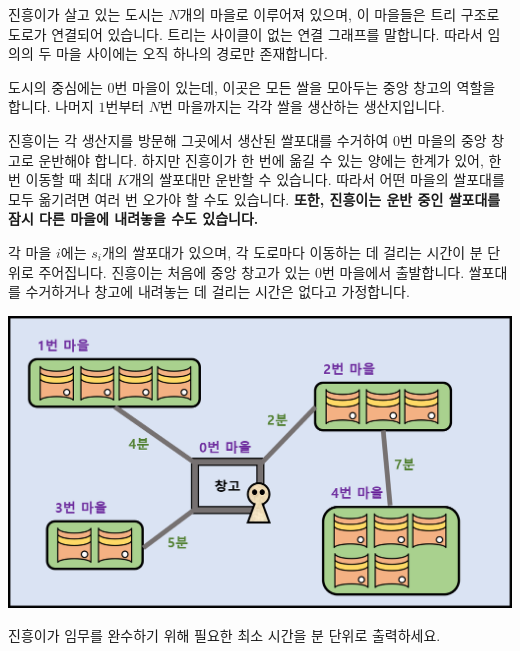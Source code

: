 진흥이가 살고 있는 도시는 $N$개의 마을로 이루어져 있으며, 이 마을들은 트리 구조로 도로가 연결되어 있습니다. 트리는 사이클이 없는 연결 그래프를 말합니다. 따라서 임의의 두 마을 사이에는 오직 하나의 경로만 존재합니다.

도시의 중심에는 $0$번 마을이 있는데, 이곳은 모든 쌀을 모아두는 중앙 창고의 역할을 합니다. 나머지 $1$번부터 $N$번 마을까지는 각각 쌀을 생산하는 생산지입니다.

진흥이는 각 생산지를 방문해 그곳에서 생산된 쌀포대를 수거하여 $0$번 마을의 중앙 창고로 운반해야 합니다. 하지만 진흥이가 한 번에 옮길 수 있는 양에는 한계가 있어, 한 번 이동할 때 최대 $K$개의 쌀포대만 운반할 수 있습니다. 따라서 어떤 마을의 쌀포대를 모두 옮기려면 여러 번 오가야 할 수도 있습니다. \textbf{또한, 진흥이는 운반 중인 쌀포대를 잠시 다른 마을에 내려놓을 수도 있습니다.}

각 마을 $i$에는 $s_i$개의 쌀포대가 있으며, 각 도로마다 이동하는 데 걸리는 시간이 분 단위로 주어집니다. 진흥이는 처음에 중앙 창고가 있는 $0$번 마을에서 출발합니다. 쌀포대를 수거하거나 창고에 내려놓는 데 걸리는 시간은 없다고 가정합니다.

\begin{center}
\includegraphics{town.png}
\end{center}

진흥이가 임무를 완수하기 위해 필요한 최소 시간을 분 단위로 출력하세요.